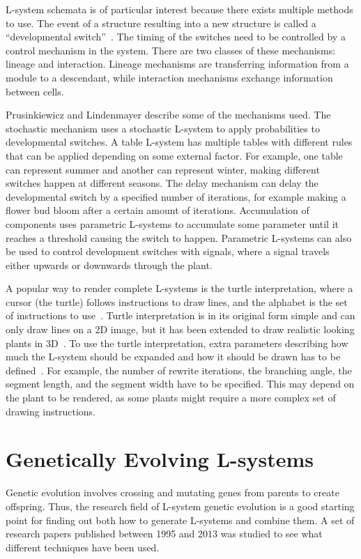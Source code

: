 L-system schemata is of particular interest because there exists multiple methods to use.
The event of a structure resulting into a new structure is called a ``developmental switch''~\cite{2012Prusinkiewicz}.
The timing of the switches need to be controlled by a control mechanism in the system.
There are two classes of these mechanisms: lineage and interaction.
Lineage mechanisms are transferring information from a module to a descendant, while interaction mechanisms exchange information between cells.

Prusinkiewicz and Lindenmayer describe some of the mechanisms used.
The stochastic mechanism uses a stochastic L-system to apply probabilities to developmental switches.
A table L-system has multiple tables with different rules that can be applied depending on some external factor.
For example, one table can represent summer and another can represent winter, making different switches happen at different seasons.
The delay mechanism can delay the developmental switch by a specified number of iterations, for example making a flower bud bloom after a certain amount of iterations.
Accumulation of components uses parametric L-systems to accumulate some parameter until it reaches a threshold causing the switch to happen.
Parametric L-systems can also be used to control development switches with signals, where a signal travels either upwards or downwards through the plant.~\cite{2012Prusinkiewicz}

A popular way to render complete L-systems is the turtle interpretation, where a cursor (the turtle) follows instructions to draw lines, and the alphabet is the set of instructions to use~\cite{2012Prusinkiewicz}.
Turtle interpretation is in its original form simple and can only draw lines on a 2D image, but it has been extended to draw realistic looking plants in 3D~\cite{2012Prusinkiewicz}.
To use the turtle interpretation, extra parameters describing how much the L-system should be expanded and how it should be drawn has to be defined~\cite{2012Prusinkiewicz}.
For example, the number of rewrite iterations, the branching angle, the segment length, and the segment width have to be specified.
This may depend on the plant to be rendered, as some plants might require a more complex set of drawing instructions.

\section{Genetically Evolving L-systems}
Genetic evolution involves crossing and mutating genes from parents to create offspring.
Thus, the research field of L-system genetic evolution is a good starting point for finding out both how to generate L-systems and combine them.
A set of research papers published between 1995 and 2013 was studied to see what different techniques have been used.

